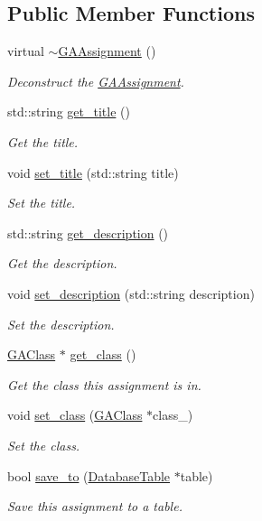\subsection*{Public Member Functions}
\begin{DoxyCompactItemize}
\item 
virtual \hyperlink{class_g_a_assignment_a09ccbb9ff47203cf98fce42fe934e4d2}{$\sim$\+G\+A\+Assignment} ()
\begin{DoxyCompactList}\small\item\em Deconstruct the \hyperlink{class_g_a_assignment}{G\+A\+Assignment}. \end{DoxyCompactList}\item 
std\+::string \hyperlink{class_g_a_assignment_afd2ee339549f674108e1d0cb9996c1fe}{get\+\_\+title} ()
\begin{DoxyCompactList}\small\item\em Get the title. \end{DoxyCompactList}\item 
void \hyperlink{class_g_a_assignment_ac5463bd1ed519444c85a8b4946b22e27}{set\+\_\+title} (std\+::string title)
\begin{DoxyCompactList}\small\item\em Set the title. \end{DoxyCompactList}\item 
std\+::string \hyperlink{class_g_a_assignment_aa79940e35e148a0784b70efc33f93da4}{get\+\_\+description} ()
\begin{DoxyCompactList}\small\item\em Get the description. \end{DoxyCompactList}\item 
void \hyperlink{class_g_a_assignment_ae1d657cde83c753067e77347141b49c4}{set\+\_\+description} (std\+::string description)
\begin{DoxyCompactList}\small\item\em Set the description. \end{DoxyCompactList}\item 
\hyperlink{class_g_a_class}{G\+A\+Class} $\ast$ \hyperlink{class_g_a_assignment_ae16983396d1f57845b70f607ec44dc41}{get\+\_\+class} ()
\begin{DoxyCompactList}\small\item\em Get the class this assignment is in. \end{DoxyCompactList}\item 
void \hyperlink{class_g_a_assignment_a5e54b228743afce1120b6aee837b06c0}{set\+\_\+class} (\hyperlink{class_g_a_class}{G\+A\+Class} $\ast$class\+\_\+)
\begin{DoxyCompactList}\small\item\em Set the class. \end{DoxyCompactList}\item 
bool \hyperlink{class_g_a_assignment_a2481b0469431c06bf4d28f588e3c8cf4}{save\+\_\+to} (\hyperlink{class_database_table}{Database\+Table} $\ast$table)
\begin{DoxyCompactList}\small\item\em Save this assignment to a table. \end{DoxyCompactList}\end{DoxyCompactItemize}
